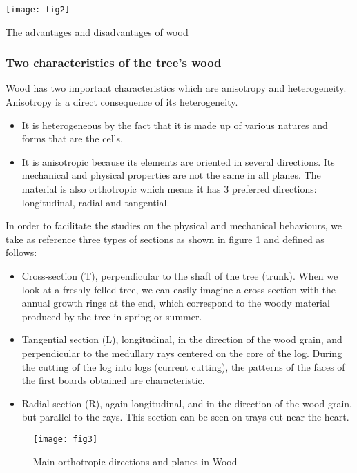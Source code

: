 \begin{table}[htp]
	\centering
	\texttt{[image: fig2]}
	\caption{The advantages and disadvantages of wood}
	\label{fig:fig2}
\end{table}

\subsubsection{Two characteristics of the tree's wood}

Wood has two important characteristics which are anisotropy and heterogeneity. Anisotropy is a direct consequence of its heterogeneity.

\begin{itemize}
	\item It is heterogeneous by the fact that it is made up of various natures and forms that are the cells. 
	\item It is anisotropic because its elements are oriented in several directions. Its mechanical and physical properties are not the same in all planes. The material is also orthotropic which means it has 3 preferred directions: longitudinal, radial and tangential.
\end{itemize}

In order to facilitate the studies on the physical and mechanical behaviours, we take as reference three types of sections as shown in figure \ref{fig:fig3} and defined as follows:

\begin{itemize}
	\item Cross-section (T), perpendicular to the shaft of the tree (trunk). When we look at a freshly felled tree, we can easily imagine a cross-section with the annual growth rings at the end, which correspond to the woody material produced by the tree in spring or summer.
	\item Tangential section (L), longitudinal, in the direction of the wood grain, and perpendicular to the medullary rays centered on the core of the log. During the cutting of the log into logs (current cutting), the patterns of the faces of the first boards obtained are characteristic.
	\item Radial section (R), again longitudinal, and in the direction of the wood grain, but parallel
	to the rays. This section can be seen on trays cut near the heart.
\end{itemize}


\begin{figure}[htp]
	\centering
	\texttt{[image: fig3]}
	\caption{Main orthotropic directions and planes in Wood}
	\label{fig:fig3}
\end{figure}

